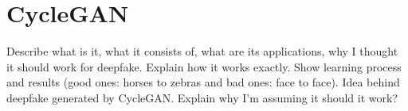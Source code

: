 \section{CycleGAN}
Describe what is it, what it consists of, what are its applications, why I thought it should work for deepfake. Explain how it works exactly. Show learning process and results (good ones: horses to zebras and bad ones: face to face). Idea behind deepfake generated by CycleGAN. Explain why I'm assuming it should it work?